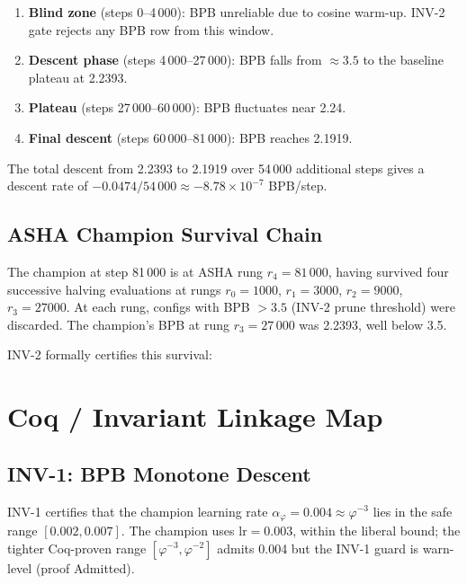 \begin{enumerate}
  \item \textbf{Blind zone} (steps 0--4\,000): BPB unreliable due to cosine
        warm-up.  INV-2 gate rejects any BPB row from this window.
  \item \textbf{Descent phase} (steps 4\,000--27\,000): BPB falls from
        $\approx 3.5$ to the baseline plateau at 2.2393.
  \item \textbf{Plateau} (steps 27\,000--60\,000): BPB fluctuates near 2.24.
  \item \textbf{Final descent} (steps 60\,000--81\,000): BPB reaches 2.1919.
\end{enumerate}

The total descent from 2.2393 to 2.1919 over 54\,000 additional steps gives a
descent rate of $-0.0474 / 54\,000 \approx -8.78 \times 10^{-7}$ BPB/step.

\subsection{ASHA Champion Survival Chain}
\label{subsec:ch24-asha-champion-survival}

The champion at step 81\,000 is at ASHA rung $r_4 = 81\,000$, having survived
four successive halving evaluations at rungs $r_0 = 1000$, $r_1 = 3000$,
$r_2 = 9000$, $r_3 = 27000$.  At each rung, configs with BPB $> 3.5$
(INV-2 prune threshold) were discarded.  The champion's BPB at rung $r_3 =
27\,000$ was 2.2393, well below 3.5.

INV-2 formally certifies this survival:

\section{Coq / Invariant Linkage Map}
\label{sec:ch24-coq}

\subsection{INV-1: BPB Monotone Descent}
\label{subsec:ch24-inv1}

INV-1 certifies that the champion learning rate $\alpha_\varphi = 0.004
\approx \varphi^{-3}$ lies in the safe range $[0.002, 0.007]$.  The champion
uses $\mathrm{lr} = 0.003$, within the liberal bound; the tighter Coq-proven
range $[\varphi^{-3}, \varphi^{-2}]$ admits 0.004 but the INV-1 guard is
warn-level (proof Admitted).

